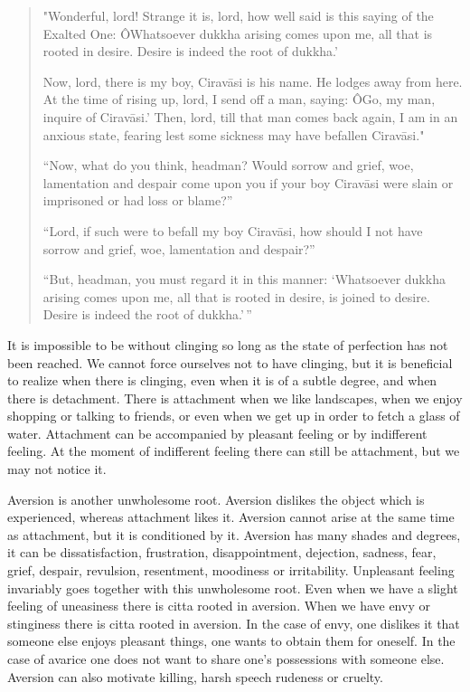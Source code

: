 \documentclass{book}
\begin{document}
\begin{quote}
"Wonderful, lord! Strange it is, lord, how well said is this saying of
the Exalted One: ÔWhatsoever dukkha arising comes upon me, all that is
rooted in desire. Desire is indeed the root of dukkha.'

Now, lord, there is my boy, Ciravāsi is his name. He lodges away from
here. At the time of rising up, lord, I send off a man, saying: ÔGo, my
man, inquire of Ciravāsi.' Then, lord, till that man comes back again, I
am in an anxious state, fearing lest some sickness may have befallen
Ciravāsi."

``Now, what do you think, headman? Would sorrow and grief, woe,
lamentation and despair come upon you if your boy Ciravāsi were slain or
imprisoned or had loss or blame?''

``Lord, if such were to befall my boy Ciravāsi, how should I not have
sorrow and grief, woe, lamentation and despair?''

``But, headman, you must regard it in this manner: `Whatsoever dukkha
arising comes upon me, all that is rooted in desire, is joined to
desire. Desire is indeed the root of dukkha.'\,''
\end{quote}

It is impossible to be without clinging so long as the state of
perfection has not been reached. We cannot force ourselves not to have
clinging, but it is beneficial to realize when there is clinging, even
when it is of a subtle degree, and when there is detachment. There is
attachment when we like landscapes, when we enjoy shopping or talking to
friends, or even when we get up in order to fetch a glass of water.
Attachment can be accompanied by pleasant feeling or by indifferent
feeling. At the moment of indifferent feeling there can still be
attachment, but we may not notice it.

Aversion is another unwholesome root. Aversion dislikes the object which
is experienced, whereas attachment likes it. Aversion cannot arise at
the same time as attachment, but it is conditioned by it. Aversion has
many shades and degrees, it can be dissatisfaction, frustration,
disappoint­ment, dejection, sadness, fear, grief, despair, revulsion,
resentment, moodiness or irritability. Unpleasant feeling invariably
goes together with this unwholesome root. Even when we have a slight
feeling of uneasiness there is citta rooted in aversion. When we have
envy or stinginess there is citta rooted in aversion. In the case of
envy, one dislikes it that someone else enjoys pleasant things, one
wants to obtain them for oneself. In the case of avarice one does not
want to share one's possessions with someone else. Aversion can also
motivate killing, harsh speech rudeness or cruelty.
\end{document}
